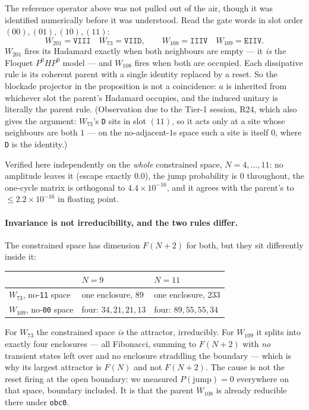 \documentclass[11pt]{article}
\newcommand{\rt}[1]{\texttt{#1}}
\theoremstyle{plain}
\begin{document}
The reference operator above was not pulled out of the air, though it was
identified numerically before it was understood. Read the gate words in slot
order $(00),(01),(10),(11)$:
\[
W_{201}=\rt{VIII}\quad W_{73}=\rt{VIID}, \qquad
W_{108}=\rt{IIIV}\quad W_{109}=\rt{EIIV}.
\]
$W_{201}$ fires its Hadamard exactly when both neighbours are empty --- it
\emph{is} the Floquet $P^0HP^0$ model --- and $W_{108}$ fires when both are
occupied. Each dissipative rule is its coherent parent with a single identity
replaced by a reset. So the blockade projector in the proposition is not a
coincidence: $a$ is inherited from whichever slot the parent's Hadamard occupies,
and the induced unitary is literally the parent rule. (Observation due to the
Tier-1 session, R24, which also gives the argument: $W_{73}$'s \rt{D} sits in
slot $(11)$, so it acts only at a site whose neighbours are both $1$ --- on the
no-adjacent-$1$s space such a site is itself $0$, where \rt{D} is the identity.)

Verified here independently on the \emph{whole} constrained space, $N=4,\dots,11$:
no amplitude leaves it (escape exactly $0.0$), the jump probability is $0$
throughout, the one-cycle matrix is orthogonal to $4.4\times10^{-16}$, and it
agrees with the parent's to $\le2.2\times10^{-16}$ in floating point.

\paragraph{Invariance is not irreducibility, and the two rules differ.} The
constrained space has dimension $F(N+2)$ for both, but they sit differently
inside it:
\begin{center}
\begin{tabular}{lll}
\toprule
 & $N=9$ & $N=11$ \\
\midrule
$W_{73}$, no-\rt{11} space & one enclosure, $89$ & one enclosure, $233$ \\
$W_{109}$, no-\rt{00} space & four: $34,21,21,13$ & four: $89,55,55,34$ \\
\bottomrule
\end{tabular}
\end{center}
For $W_{73}$ the constrained space \emph{is} the attractor, irreducibly. For
$W_{109}$ it splits into exactly four enclosures --- all Fibonacci, summing to
$F(N+2)$ with \emph{no} transient states left over and no enclosure straddling
the boundary --- which is why its largest attractor is $F(N)$ and not $F(N+2)$.
The cause is not the reset firing at the open boundary: we measured
$P(\text{jump})=0$ everywhere on that space, boundary included. It is that the
parent $W_{108}$ is already reducible there under \rt{obc0}.
\end{document}
